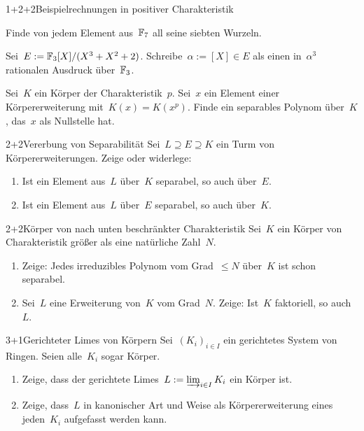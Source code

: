 \documentclass{algblatt}
\begin{document}

\begin{aufgabeE}{1+2+2}{Beispielrechnungen in positiver Charakteristik}
\item Finde von jedem Element aus~$\mathbb{F}_7$ all seine siebten Wurzeln.
\item Sei~$E := \mathbb{F}_3[X]/(X^3 + X^2 + 2)$. Schreibe~$\alpha := [X] \in E$ als einen
in~$\alpha^3$ rationalen Ausdruck über~$\mathbb{F}_3$.
\item Sei~$K$ ein Körper der Charakteristik~$p$. Sei~$x$ ein Element einer
Körpererweiterung mit~$K(x) = K(x^p)$. Finde ein separables Polynom
über~$K$, das~$x$ als Nullstelle hat.
\end{aufgabeE}

\begin{aufgabe}{2+2}{Vererbung von Separabilität}
Sei~$L \supseteq E \supseteq K$ ein Turm von Körpererweiterungen. Zeige oder
widerlege:
\begin{enumerate}
\item Ist ein Element aus~$L$ über~$K$ separabel, so auch über~$E$.
\item Ist ein Element aus~$L$ über~$E$ separabel, so auch über~$K$.
\end{enumerate}
\end{aufgabe}

\begin{aufgabe}{2+2}{Körper von nach unten beschränkter Charakteristik}
Sei~$K$ ein Körper von Charakteristik größer als eine natürliche Zahl~$N$.
\begin{enumerate}
\item Zeige: Jedes irreduzibles Polynom vom Grad~$\leq N$ über~$K$ ist schon
separabel.
\item Sei~$L$ eine Erweiterung von~$K$ vom Grad~$N$.
Zeige: Ist~$K$ faktoriell, so auch~$L$.
\end{enumerate}
\end{aufgabe}

\begin{aufgabe}{3+1}{Gerichteter Limes von Körpern}
Sei~$(K_i)_{i \in I}$ ein gerichtetes System von Ringen. Seien alle~$K_i$ sogar
Körper.
\begin{enumerate}
\item Zeige, dass der gerichtete Limes~$L := \varinjlim_{i \in I} K_i$ ein
Körper ist.
\item Zeige, dass~$L$ in kanonischer Art und Weise als Körpererweiterung eines
jeden~$K_i$ aufgefasst werden kann.
\end{enumerate}
\end{aufgabe}
\end{document}
